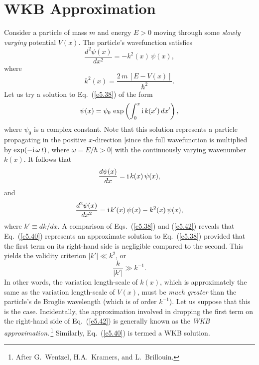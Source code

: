 \section{WKB Approximation}
Consider a particle of mass $m$ and energy $E>0$ moving through some {\em slowly varying}\/
potential $V(x)$. The particle's wavefunction satisfies
\begin{equation}\label{e5.38}
\frac{d^2\psi(x)}{dx^2} = - k^2(x)\,\psi(x),
\end{equation}
where
\begin{equation}
k^2(x) = \frac{2\,m\,[E-V(x)]}{\hbar^2}.
\end{equation}
Let us try a solution to Eq.~(\ref{e5.38}) of the form
\begin{equation}\label{e5.40}
\psi(x) = \psi_0\,\exp\left(\int_0^x{\rm i}\,k(x')\,dx'\right),
\end{equation}
where $\psi_0$ is a complex constant. Note that this solution represents
a particle propagating in the positive $x$-direction [since the full
wavefunction is multiplied by $\exp(-{\rm i}\,\omega\,t)$, where $\omega=E/\hbar>0$] with the continuously varying wavenumber
$k(x)$.
It follows that
\begin{equation}
\frac{d\psi(x)}{dx} = {\rm i}\,k(x)\,\psi(x),
\end{equation}
and
\begin{equation}\label{e5.42}
\frac{d^2\psi(x)}{dx^2} = {\rm i}\,k'(x)\,\psi(x) - k^2(x)\,\psi(x),
\end{equation}
where $k'\equiv dk/dx$. A comparison of Eqs.~(\ref{e5.38}) and (\ref{e5.42})
reveals that Eq.~(\ref{e5.40}) represents an approximate solution to
Eq.~(\ref{e5.38}) provided that the first term on its right-hand side
is negligible compared to the second. This yields
the validity criterion $|k'|\ll k^2$, or
\begin{equation}\label{e5.43}
\frac{k}{|k'|}\gg k^{-1}.
\end{equation}
In other words, the variation length-scale of $k(x)$, which is
approximately the same as the variation length-scale of $V(x)$, must
be {\em much greater}\/ than the particle's de Broglie wavelength (which
is of order $k^{-1}$). Let us suppose that this is the case. Incidentally,
the approximation involved in dropping the first term on the right-hand side
of Eq.~(\ref{e5.42}) is generally known as the {\em WKB approximation}.\,\footnote{After G.~Wentzel, H.A.~Kramers, and L.~Brillouin.}
Similarly, Eq.~(\ref{e5.40}) is termed a WKB solution.


